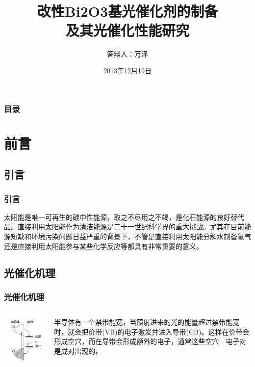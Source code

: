 \documentclass[xetex,compress]{mybeamer}
\title{改性Bi{\scriptsize 2}O{\scriptsize 3}基光催化剂的制备\\[10pt]及其光催化性能研究}
\author{答辩人：万泽}
\institute{指导教师：××× 教授}
\date{2013年12月19日}
\begin{document}
\begin{frame}
\titlepage
\end{frame}


\begin{frame}
\frametitle{目录}
\setcounter{tocdepth}{1}
\tableofcontents[pausesections]%
\end{frame}


\section{前言}%
\subsection{引言}
\begin{frame}
\frametitle{引言}
\begin{block}{}
太阳能是唯一可再生的碳中性能源，取之不尽用之不竭，是化石能源的良好替代品。直接利用太阳能作为清洁能源是二十一世纪科学界的重大挑战。尤其在目前能源短缺和环境污染问题日益严重的背景下，不管是直接利用太阳能分解水制备氢气还是直接利用太阳能参与某些化学反应等都具有非常重要的意义。
\end{block}
\end{frame}


\subsection{光催化机理}
\begin{frame}
\frametitle{光催化机理}
\begin{columns}
\begin{block}{}
\centering
\includegraphics[scale=0.6]{figures/光催化机理图} 
\end{block}
\begin{block}{}
半导体有一个禁带能宽，当照射进来的光的能量超过禁带能宽时，就会把价带(VB)的电子激发并进入导带(CB)。这样在价带会形成空穴，而在导带会形成额外的电子，通常这些空穴—电子对是成对出现的。
\end{block}
\end{columns}
\end{frame}
\end{document}
